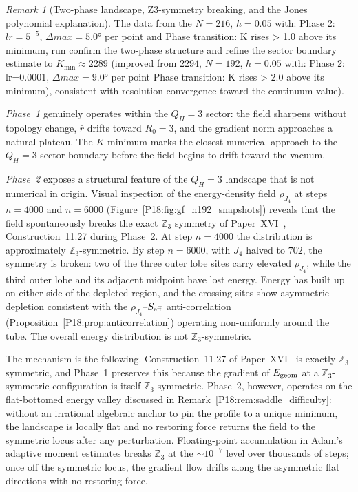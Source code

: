 \documentclass[11pt,a4paper]{article}
\theoremstyle{definition}\newtheorem{definition}[theorem]{Definition}
\theoremstyle{remark}
\newtheorem{remark}[theorem]{Remark}
\newcommand{\QH}{Q_H}
\begin{document}
\begin{remark}[Two-phase landscape, Z3-symmetry breaking, and the Jones
  polynomial explanation]
\label{P18:rem:gf_twophase_p18}
The data from the $N=216$, $h=0.05$  with:
Phase 2: $lr=5^{-5}$, $\Delta{max}=5.0°$ per point and
Phase transition: K rises > 1.0 above its minimum,
run confirm the two-phase structure
and refine the sector boundary estimate to $K_{\min}\approx2289$
(improved from $2294$, $N=192$, $h=0.05$ with:
Phase 2: lr=0.0001, $\Delta{max}=9.0°$ per point
Phase transition: K rises > 2.0 above its minimum), consistent with resolution
convergence toward the continuum value).

\emph{Phase~1} genuinely operates within the $\QH=3$ sector: the field
sharpens without topology change, $\bar r$ drifts toward $R_0=3$,
and the gradient norm approaches a natural plateau.  The $K$-minimum
marks the closest numerical approach to the $\QH=3$ sector boundary
before the field begins to drift toward the vacuum.

\emph{Phase~2} exposes a structural feature of the $\QH=3$ landscape that
is not numerical in origin.  Visual inspection of the energy-density field
$\rho_{J_4}$ at steps $n=4000$ and $n=6000$ (Figure~\ref{P18:fig:gf_n192_snapshots})
reveals that the field spontaneously breaks the exact $\mathbb{Z}_3$ symmetry
of Paper~XVI~\cite{Paper16}, Construction~11.27 during Phase~2.  At step
$n=4000$ the distribution is approximately $\mathbb{Z}_3$-symmetric.  By
step $n=6000$, with $J_4$ halved to $702$, the symmetry is broken: two of
the three outer lobe sites carry elevated $\rho_{J_4}$, while the third
outer lobe and its adjacent midpoint have lost energy.  Energy has built
up on either side of the depleted region, and the crossing sites show
asymmetric depletion consistent with the $\rho_{J_4}$--$S_{\rm eff}$
anti-correlation (Proposition~\ref{P18:prop:anticorrelation}) operating
non-uniformly around the tube.  The overall energy distribution is not
$\mathbb{Z}_3$-symmetric.

The mechanism is the following.  Construction~11.27 of Paper~XVI~\cite{Paper16}
is exactly $\mathbb{Z}_3$-symmetric, and Phase~1 preserves this because
the gradient of $E_{\rm geom}$ at a $\mathbb{Z}_3$-symmetric configuration
is itself $\mathbb{Z}_3$-symmetric.  Phase~2, however, operates on the
flat-bottomed energy valley discussed in
Remark~\ref{P18:rem:saddle_difficulty}: without an irrational
algebraic anchor to pin the profile to a unique minimum, the
landscape is locally flat and no restoring force returns the field
to the symmetric locus after any perturbation.  Floating-point
accumulation in Adam's adaptive moment estimates breaks $\mathbb{Z}_3$
at the $\sim10^{-7}$ level over thousands of steps; once off the symmetric
locus, the gradient flow drifts along the asymmetric flat directions with
no restoring force.


\end{remark}
\end{document}
